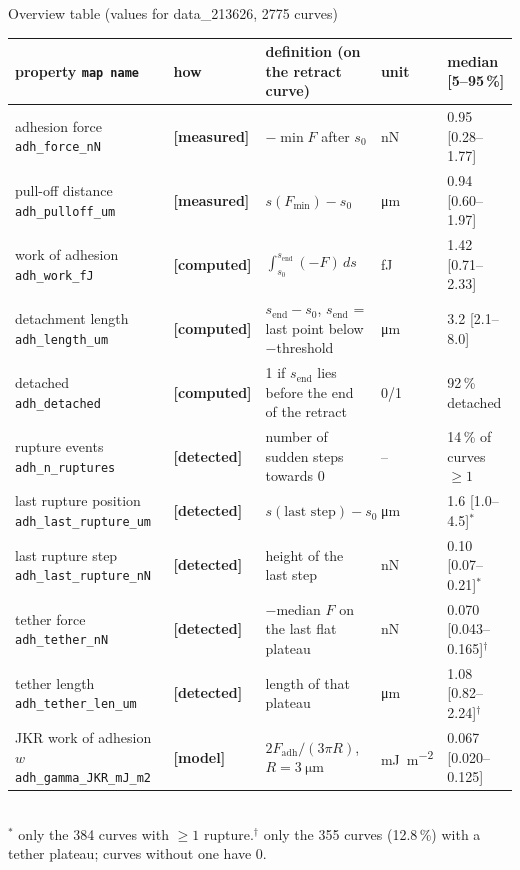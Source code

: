 \documentclass[aspectratio=169,9pt]{beamer}
\newcommand{\tagM}{\textcolor{cGreen}{\textbf{[measured]}}}
\newcommand{\tagC}{\textcolor{cOrange}{\textbf{[computed]}}}
\newcommand{\tagD}{\textcolor{cPurple}{\textbf{[detected]}}}
\newcommand{\tagMo}{\textcolor{cRed}{\textbf{[model]}}}
\begin{document}
\begin{frame}{Overview table (values for data\_213626, 2775 curves)}
\scriptsize\renewcommand{\arraystretch}{1.0}
\begin{tabularx}{\textwidth}{@{}p{3.3cm} l X l l@{}}
\toprule
property \quad\texttt{map name} & how & definition (on the retract curve) & unit & median [5--95\,\%]\\
\midrule
adhesion force \newline\texttt{adh\_force\_nN} & \tagM & $-\min F$ after $s_0$ & \si{\nano\newton} & 0.95 [0.28--1.77]\\
pull-off distance \newline\texttt{adh\_pulloff\_um} & \tagM & $s(F_\text{min})-s_0$ & \si{\micro\metre} & 0.94 [0.60--1.97]\\
work of adhesion \newline\texttt{adh\_work\_fJ} & \tagC & $\int_{s_0}^{s_\text{end}}(-F)\,ds$ & \si{\femto\joule} & 1.42 [0.71--2.33]\\
detachment length \newline\texttt{adh\_length\_um} & \tagC & $s_\text{end}-s_0$, $s_\text{end}$ = last point below $-$threshold & \si{\micro\metre} & 3.2 [2.1--8.0]\\
detached \newline\texttt{adh\_detached} & \tagC & 1 if $s_\text{end}$ lies before the end of the retract & 0/1 & 92\,\% detached\\
rupture events \newline\texttt{adh\_n\_ruptures} & \tagD & number of sudden steps towards 0 & -- & 14\,\% of curves $\ge 1$\\
last rupture position \newline\texttt{adh\_last\_rupture\_um} & \tagD & $s(\text{last step})-s_0$ & \si{\micro\metre} & 1.6 [1.0--4.5]$^{*}$\\
last rupture step \newline\texttt{adh\_last\_rupture\_nN} & \tagD & height of the last step & \si{\nano\newton} & 0.10 [0.07--0.21]$^{*}$\\
tether force \newline\texttt{adh\_tether\_nN} & \tagD & $-$median $F$ on the last flat plateau & \si{\nano\newton} & 0.070 [0.043--0.165]$^{\dagger}$\\
tether length \newline\texttt{adh\_tether\_len\_um} & \tagD & length of that plateau & \si{\micro\metre} & 1.08 [0.82--2.24]$^{\dagger}$\\
JKR work of adhesion $w$ \newline\texttt{adh\_gamma\_JKR\_mJ\_m2} & \tagMo & $2F_\text{adh}/(3\pi R)$, $R=\SI{3}{\micro\metre}$ & \si{\milli\joule\per\square\metre} & 0.067 [0.020--0.125]\\
\bottomrule
\end{tabularx}\\[1pt]
\tiny $^{*}$ only the 384 curves with $\ge1$ rupture.\quad $^{\dagger}$ only the 355 curves (12.8\,\%) with a tether plateau; curves without one have 0.
\end{frame}
\end{document}
